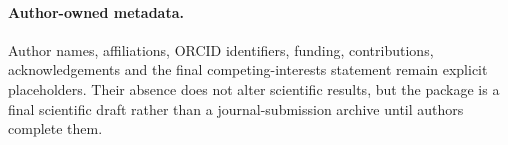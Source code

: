 \paragraph{Author-owned metadata.} Author names, affiliations, ORCID identifiers, funding, contributions, acknowledgements and the final competing-interests statement remain explicit placeholders. Their absence does not alter scientific results, but the package is a final scientific draft rather than a journal-submission archive until authors complete them.
